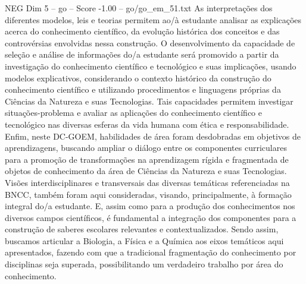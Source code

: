 \begin{textsample}{NEG Dim 5 – go – Score -1.00 – go/go\_em\_51.txt}
As interpretações dos diferentes modelos, leis e teorias permitem ao/à estudante analisar as explicações acerca do conhecimento científico, da evolução histórica dos conceitos e das controvérsias envolvidas nessa construção.
O desenvolvimento da capacidade de seleção e análise de informações do/a estudante será promovido a partir da investigação do conhecimento científico e tecnológico e suas implicações, usando modelos explicativos, considerando o contexto histórico da construção do conhecimento científico e utilizando procedimentos e linguagens próprias da Ciências da Natureza e suas Tecnologias.
Tais capacidades permitem investigar situações-problema e avaliar as aplicações do conhecimento científico e tecnológico nas diversas esferas da vida humana com ética e responsabilidade.
Enfim, neste DC-GOEM, habilidades de área foram desdobradas em objetivos de aprendizagens, buscando ampliar o diálogo entre os componentes curriculares para a promoção de transformações na aprendizagem rígida e fragmentada de objetos de conhecimento da área de Ciências da Natureza e suas Tecnologias.
Visões interdisciplinares e transversais das diversas temáticas referenciadas na BNCC, também foram aqui consideradas, visando, principalmente, à formação integral do/a estudante.
E, assim como para a produção dos conhecimentos nos diversos campos científicos, é fundamental a integração dos componentes para a construção de saberes escolares relevantes e contextualizados.
Sendo assim, buscamos articular a Biologia, a Física e a Química aos eixos temáticos aqui apresentados, fazendo com que a tradicional fragmentação do conhecimento por disciplinas seja superada, possibilitando um verdadeiro trabalho por área do conhecimento.

\end{textsample}
